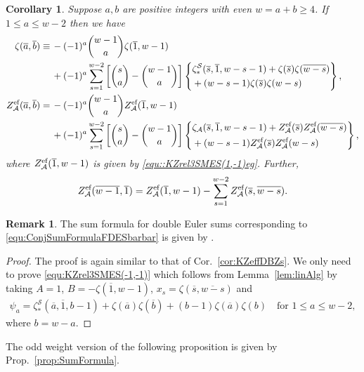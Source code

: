 \documentclass{article}
\newcommand{\Sy}{{\mathcal S}}
\newcommand{\calA}{\mathcal{A}}
\newcommand{\eff}{\text{\rm{ef}}}
\newcommand{\ol}{\overline}
\theoremstyle{plain}
\newtheorem{cor}[thm]{Corollary}
\theoremstyle{definition}
\newtheorem{rem}[thm]{Remark}
\begin{document}
\begin{cor}\label{cor:KZeffDBES(-1,-1)}
Suppose $a,b$ are positive integers with even $w=a+b\ge 4$. If $1\le a\le w-2$ then we have
\begin{align} \label{equ:KZrel3SMES(-1,-1)}
\zeta(\ol{a},\ol{b})\equiv &\, -(-1)^a \binom{w-1}{a}\zeta(\ol{1},w-1)\\
&\,+ (-1)^{a}\sum_{s=1}^{w-2} \left[ \binom{s}{a}-\binom{w-1}{a}\right]
\left\{\aligned
&\zeta_\ast^\Sy(\ol{s},\ol{1},w-s-1)+\zeta(\ol{s})\zeta(\ol{w-s}) \\
&+(w-s-1)\zeta(\ol{s})\zeta(w-s)\endaligned \right\}, \notag\\     %
Z_\calA^\eff(\ol{a},\ol{b})=&\,-(-1)^a \binom{w-1}{a} Z_\calA^\eff(\ol{1},w-1)  \notag\\
&\,+ (-1)^{a}\sum_{s=1}^{w-2} \left[ \binom{s}{a}-\binom{w-1}{a}\right]
\left\{\aligned
&\zeta_\calA(\ol{s},\ol{1},w-s-1)+Z_\calA^\eff(\ol{s})Z_\calA^\eff(\ol{w-s}) \\
&+(w-s-1)Z_\calA^\eff(\ol{s})Z_\calA^\eff(w-s)\endaligned \right\}, \notag
\end{align}
where $Z_\calA^\eff(\ol{1},w-1)$ is given by \eqref{equ::KZrel3SMES(1,-1)eg}. Further,
\begin{align}
Z_\calA^\eff(\ol{w-1},\ol{1})=Z_\calA^\eff(\ol{1},w-1)-\sum_{s=1}^{w-2} Z_\calA^\eff(\ol{s},\ol{w-s}) .  \label{equ:ConjSumFormulaFDESbarbar}
\end{align}
\end{cor}

\begin{rem}
The sum formula for double Euler sums corresponding to \eqref{equ:ConjSumFormulaFDESbarbar} is given by  \cite[Theorem 4.2]{BCJXXZhao2020c}.
\end{rem}

\begin{proof}
The proof is again similar to that of Cor.~\ref{cor:KZeffDBZs}. We only need to prove \eqref{equ:KZrel3SMES(-1,-1)}  which follows from Lemma~\ref{lem:linAlg} by taking $A=1$, $B=-\zeta(\ol{1},w-1)$,
$x_s=\zeta(\ol{s},\ol{w-s})$  and
\begin{align*}
\psi_a=\zeta_\ast^\Sy(\ol{a},\ol{1},b-1) +\zeta(\ol{a})\zeta(\ol{b}) +(b-1)\zeta(\ol{a})\zeta(b)
  \quad \text{for } 1\le a\le w-2,
\end{align*}
where $b=w-a$.
\end{proof}

The odd weight version of the following proposition is given by Prop.~\ref{prop:SumFormula}.
\end{document}
